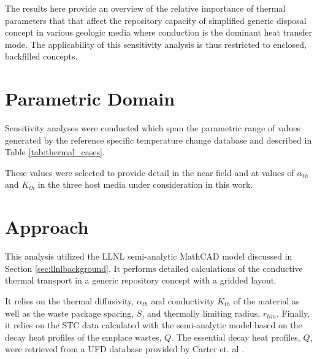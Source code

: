
The results here provide an overview of the relative importance of thermal
parameters that that affect the repository capacity of simplified generic
disposal concept in various geologic media where conduction is the dominant
heat transfer mode. The applicability of this sensitivity analysis is thus
restricted to enclosed, backfilled concepts.  

\section{Parametric Domain}

Sensitivity analyses were conducted which span the parametric range of values 
generated by the reference specific temperature change database and described 
in Table \ref{tab:thermal_cases}.  



These values were selected to provide detail in the near field and at values of
$\alpha_{th}$ and $K_{th}$ in the three host media under consideration in this
work.

\section{Approach}

This analysis utilized the \gls{LLNL} semi-analytic MathCAD model
discussed in Section \ref{sec:llnlbackground}.  It performs detailed
calculations of the conductive thermal transport in a generic repository
concept with a gridded layout.  

It relies on the thermal diffusivity, $\alpha_{th}$ and conductivity $K_{th}$ of 
the material as well as the waste package spacing, $S$, and thermally limiting 
radius, $r_{lim}$. Finally, it relies on the \gls{STC} data calculated with the 
semi-analytic model based on the decay heat profiles of the emplace wastes, $Q$. 
The essential decay heat profiles, $Q$, were retrieved from a \gls{UFD} database 
provided by Carter et. al \cite{carter_fuel_2011}.


